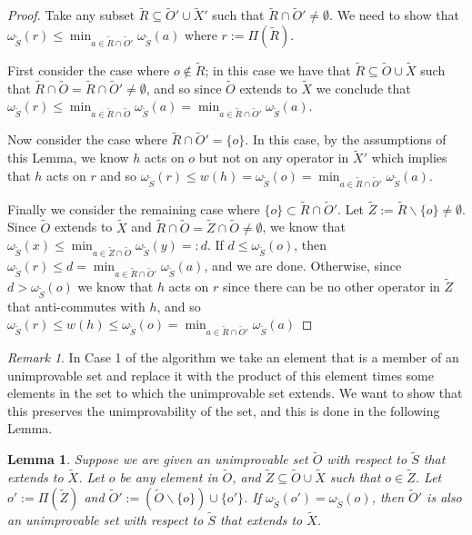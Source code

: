 \documentclass{amsbook}
\theoremstyle{plain}
\newtheorem{lemma}{Lemma}
\theoremstyle{definition}
\theoremstyle{remark}
\newtheorem{remark}{Remark}
\newcommand{\set}{\tilde}
\newcommand{\om}{\omega}
\newcommand{\paren}[1]{\left(#1\right)}
\begin{document}
\begin{proof}
Take any subset $\set R\subseteq \set O'\cup\set X'$ such that $\set R\cap\set O'\ne\emptyset$.  We need to show that $\om_{\set S}\paren{r} \le \min_{a\in\set R\cap\set O'}\om_{\set S}(a)$ where $r:=\Pi(\set R)$.

First consider the case where $o\notin \set R$;  in this case we have that $\set R\subseteq \set O\cup\set X$ such that $\set R\cap\set O=\set R\cap\set O'\ne\emptyset$, and so since $\set O$ extends to $\set X$ we conclude that $\om_{\set S}\paren{r} \le \min_{a\in\set R\cap\set O}\om_{\set S}(a)= \min_{a\in\set R\cap\set O'}\om_{\set S}(a)$.

Now consider the case where $\set R\cap\set O'=\{o\}$.  In this case, by the assumptions of this Lemma, we know $h$ acts on $o$ but not on any operator in $\set X'$ which implies that $h$ acts on $r$ and so $\om_{\set S}(r) \le w(h)=\om_{\set S}(o)=\min_{a\in\set R\cap\set O'}\om_{\set S}(a)$.

Finally we consider the remaining case where $\{o\}\subset\set R\cap\set O'$. Let $\set Z := \set R\backslash\{o\}\ne\emptyset$.  Since $\set O$ extends to $\set X$ and $\set R\cap\set O=\set Z\cap\set O\ne\emptyset$, we know that $\om_{\set S}(x)\le \min_{a\in\set Z\cap\set O}\om_{\set S}(y)=:d$.  If $d \le \om_{\set S}(o)$, then $\om_{\set S}(r)\le d = \min_{a\in\set R\cap\set O'}\om_{\set S}(a)$, and we are done.  Otherwise, since $d> \om_{\set S}(o)$ we know that $h$ acts on $r$ since there can be no other operator in $\set Z$ that anti-commutes with $h$, and so $\om_{\set S}(r) \le w(h)\le\om_{\set S}(o)=\min_{a\in\set R\cap\set O'}\om_{\set S}(a)$
\end{proof}
\begin{remark}
In Case 1 of the algorithm we take an element that is a member of an unimprovable set and replace it with the product of this element times some elements in the set to which the unimprovable set extends.  We want to show that this preserves the unimprovability of the set, and this is done in the following Lemma.
\end{remark}

\begin{lemma}
\label{lemma:replacing element with product preserves unimprovability}
Suppose we are given an unimprovable set $\set O$ with respect to $\set S$ that extends to $\set X$.  Let $o$ be any element in $\set O$, and $\set Z\subseteq \set O\cup\set X$ such that $o\in \set Z$.  Let $o':=\Pi(\set Z)$ and $\set O' := \paren{\set O\backslash\{o\}}\cup\{o'\}$.  If $\om_{\set S}(o')=\om_{\set S}(o)$, then $\set O'$ is also an unimprovable set with respect to $\set S$ that extends to $\set X$.
\end{lemma}
\end{document}
